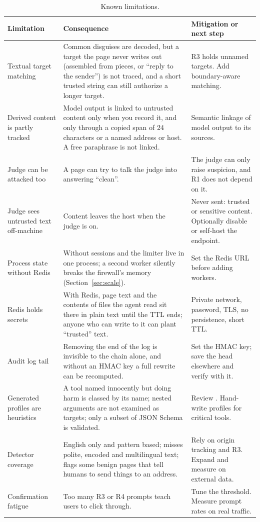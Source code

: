 \documentclass[11pt,a4paper]{article}
\newcommand{\code}[1]{\texttt{\detokenize{#1}}}
\begin{document}
\begin{table}[H]
\centering
\begin{tabularx}{\linewidth}{@{}>{\raggedright\arraybackslash}p{3.6cm}YY@{}}
\toprule
Limitation & Consequence & Mitigation or next step \\
\midrule
Textual target matching & Common disguises are decoded, but a target the page never writes out (assembled from pieces, or ``reply to the sender'') is not traced, and a short trusted string can still authorize a longer target. & R3 holds unnamed targets. Add boundary-aware matching. \\
Derived content is partly tracked & Model output is linked to untrusted content only when you record it, and only through a copied span of 24 characters or a named address or host. A free paraphrase is not linked. & Semantic linkage of model output to its sources. \\
Judge can be attacked too & A page can try to talk the judge into answering ``clean''. & The judge can only raise suspicion, and R1 does not depend on it. \\
Judge sees untrusted text off-machine & Content leaves the host when the judge is on. & Never sent: trusted or sensitive content. Optionally disable or self-host the endpoint. \\
Process state without Redis & Without \code{ORIGINGUARD_REDIS_URL} sessions and the limiter live in one process; a second worker silently breaks the firewall's memory (Section~\ref{sec:scale}). & Set the Redis URL before adding workers. \\
Redis holds secrets & With Redis, page text and the contents of files the agent read sit there in plain text until the TTL ends; anyone who can write to it can plant ``trusted'' text. & Private network, password, TLS, no persistence, short TTL. \\
Audit log tail & Removing the end of the log is invisible to the chain alone, and without an HMAC key a full rewrite can be recomputed. & Set the HMAC key; save the head elsewhere and verify with it. \\
Generated profiles are heuristics & A tool named innocently but doing harm is classed by its name; nested arguments are not examined as targets; only a subset of JSON Schema is validated. & Review \code{GET /tools}. Hand-write profiles for critical tools. \\
Detector coverage & English only and pattern based; misses polite, encoded and multilingual text; flags some benign pages that tell humans to send things to an address. & Rely on origin tracking and R3. Expand and measure on external data. \\
Confirmation fatigue & Too many R3 or R4 prompts teach users to click through. & Tune the threshold. Measure prompt rates on real traffic. \\
\bottomrule
\end{tabularx}
\caption{Known limitations.}
\end{table}
\end{document}
